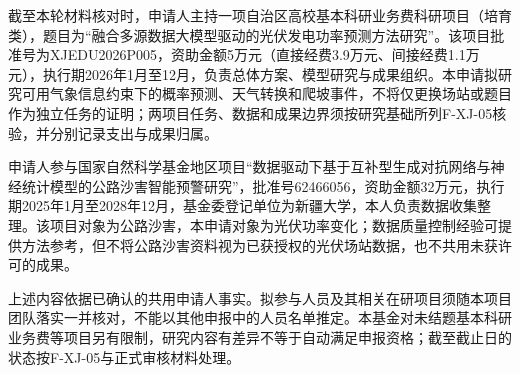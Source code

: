 \justifying
\NSFCBodyText

截至本轮材料核对时，申请人主持一项自治区高校基本科研业务费科研项目（培育类），题目为“融合多源数据大模型驱动的光伏发电功率预测方法研究”。该项目批准号为XJEDU2026P005，资助金额5万元（直接经费3.9万元、间接经费1.1万元），执行期2026年1月至12月，负责总体方案、模型研究与成果组织。本申请拟研究可用气象信息约束下的概率预测、天气转换和爬坡事件，不将仅更换场站或题目作为独立任务的证明；两项目任务、数据和成果边界须按研究基础所列F-XJ-05核验，并分别记录支出与成果归属。

申请人参与国家自然科学基金地区项目“数据驱动下基于互补型生成对抗网络与神经统计模型的公路沙害智能预警研究”，批准号62466056，资助金额32万元，执行期2025年1月至2028年12月，基金委登记单位为新疆大学，本人负责数据收集整理。该项目对象为公路沙害，本申请对象为光伏功率变化；数据质量控制经验可提供方法参考，但不将公路沙害资料视为已获授权的光伏场站数据，也不共用未获许可的成果。

上述内容依据已确认的共用申请人事实。拟参与人员及其相关在研项目须随本项目团队落实一并核对，不能以其他申报中的人员名单推定。本基金对未结题基本科研业务费等项目另有限制，研究内容有差异不等于自动满足申报资格；截至截止日的状态按F-XJ-05与正式审核材料处理。
